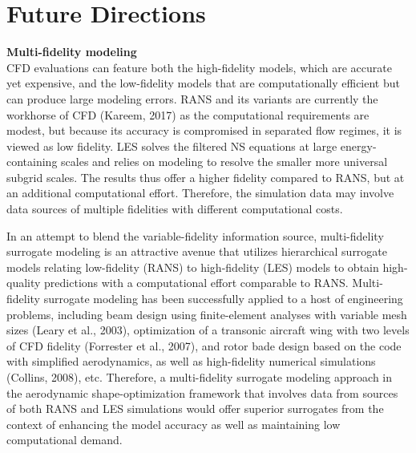 \section{Future Directions}
\label{sec:resp_cfd_wind_flow_modeling}

\noindent\textbf{Multi-fidelity modeling} \\CFD evaluations can feature both the high-fidelity models, which are accurate yet expensive, and the low-fidelity models that are computationally efficient but can produce large modeling errors. RANS and its variants are currently the workhorse of CFD (Kareem, 2017) as the computational requirements are modest, but because its accuracy is compromised in separated flow regimes, it is viewed as low fidelity. LES solves the filtered NS equations at large energy-containing scales and relies on modeling to resolve the smaller more universal subgrid scales. The results thus offer a higher fidelity compared to RANS, but at an additional computational effort. Therefore, the simulation data may involve data sources of multiple fidelities with different computational costs.

In an attempt to blend the variable-fidelity information source, multi-fidelity surrogate modeling is an attractive avenue that utilizes hierarchical surrogate models relating low-fidelity (RANS) to high-fidelity (LES) models to obtain high-quality predictions with a computational effort comparable to RANS. Multi-fidelity surrogate modeling has been successfully applied to a host of engineering problems, including beam design using finite-element analyses with variable mesh sizes (Leary et al., 2003), optimization of a transonic aircraft wing with two levels of CFD fidelity (Forrester et al., 2007), and rotor bade design based on the code with simplified aerodynamics, as well as high-fidelity numerical simulations (Collins, 2008), etc. Therefore, a multi-fidelity surrogate modeling approach in the aerodynamic shape-optimization framework that involves data from sources of both RANS and LES simulations would offer superior surrogates from the context of enhancing the model accuracy as well as maintaining low computational demand.
\newline

